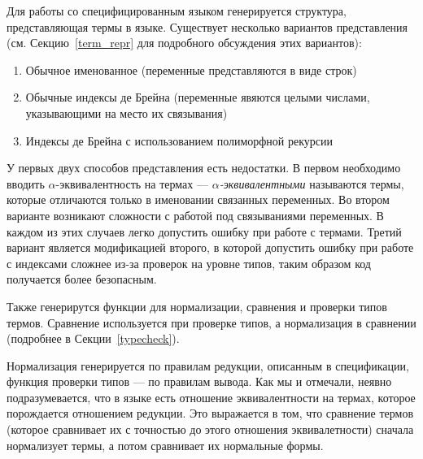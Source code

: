 Для работы со специфицированным языком генерируется структура, представляющая термы в языке. Существует несколько вариантов представления (см. Секцию~\ref{term_repr} для подробного обсуждения этих вариантов):
\begin{enumerate}
\item Обычное именованное (переменные представляются в виде строк)
\item Обычные индексы де Брейна\cite{de_brujin} (переменные явяются целыми числами, указывающими на место их связывания)
\item Индексы де Брейна с использованием полиморфной рекурсии\cite{poly_rec}
\end{enumerate}

У первых двух способов представления есть недостатки. В первом необходимо вводить $\alpha$-эквивалентность на термах --- \textit{$\alpha$-эквивалентными} называются термы, которые отличаются только в именовании связанных переменных. Во втором варианте возникают сложности с работой под связываниями переменных. В каждом из этих случаев легко допустить ошибку при работе с термами. Третий вариант является модификацией второго, в которой допустить ошибку при работе с индексами сложнее из-за проверок на уровне типов, таким образом код получается более безопасным.

Также генерирутся функции для нормализации, сравнения и проверки типов термов. Сравнение используется при проверке типов, а нормализация в сравнении (подробнее в Секции~\ref{typecheck}).

Нормализация генерируется по правилам редукции, описанным в спецификации, функция проверки типов --- по правилам вывода. Как мы и отмечали, неявно подразумевается, что в языке есть отношение эквивалентности на термах, которое порождается отношением редукции. Это выражается в том, что сравнение термов (которое сравнивает их с точностью до этого отношения эквивалетности) сначала нормализует термы, а потом сравнивает их нормальные формы.












